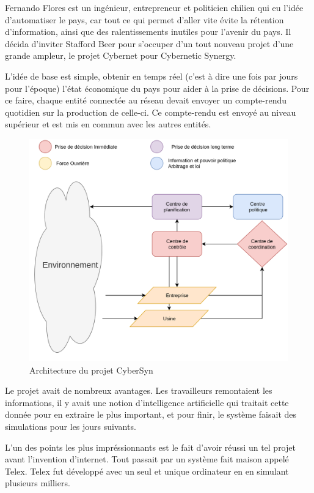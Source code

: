 Fernando Flores est un ingénieur, entrepreneur et politicien chilien qui eu l'idée
d'automatiser le pays, car tout ce qui permet d'aller vite évite la rétention d'information,
ainsi que des ralentissements inutiles pour l'avenir du pays.
Il décida d'inviter Stafford Beer pour s'occuper d'un tout nouveau projet d'une grande ampleur,
le projet Cybernet pour Cybernetic Synergy.

L'idée de base est simple, obtenir en temps réel (c'est à dire une fois par jours pour l'époque)
l'état économique du pays pour aider à la prise de décisions.
Pour ce faire, chaque entité connectée au réseau devait envoyer un compte-rendu quotidien sur
la production de celle-ci. Ce compte-rendu est envoyé au niveau supérieur et est mis en commun
avec les autres entités.

\begin{figure}[h!]
  \centering
  \includegraphics[scale=0.20]{media/cybersyn.png}
  \caption{Architecture du projet CyberSyn}
\end{figure}

Le projet avait de nombreux avantages. Les travailleurs remontaient les informations,
il y avait une notion d'intelligence artificielle qui traitait cette donnée pour en extraire
le plus important, et pour finir, le système faisait des simulations pour les jours suivants.

L'un des points les plus impréssionnants est le fait d'avoir réussi un tel projet avant
l'invention d'internet. Tout passait par un système fait maison appelé Telex.
Telex fut développé avec un seul et unique ordinateur en en simulant plusieurs milliers.

